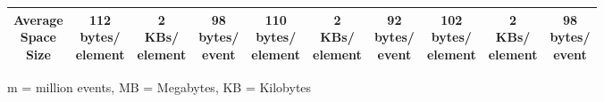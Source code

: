 \documentclass{llncs}
\begin{document}
\begin{table}[ht]
\begin{footnotesize}
\begin{tabular}{| c | c  c  c | c c c | c c c |}
            \hline
            \makecell{Average\\Space\\Size} & \makecell{112\\bytes/\\element} & \makecell{2\\KBs/\\element}  & \makecell{98 \\bytes/\\event} & \makecell{110\\bytes/\\element} & \makecell{2\\KBs/\\element} & \makecell{92\\bytes/\\event} & \makecell{102\\bytes/\\element} & \makecell{2\\KBs/\\element} & \makecell{98\\bytes/\\event} \\
            \hline 
        \end{tabular}
        \justify
        m = million events, MB = Megabytes, KB = Kilobytes
    \end{footnotesize}
\end{table}
\end{document}
